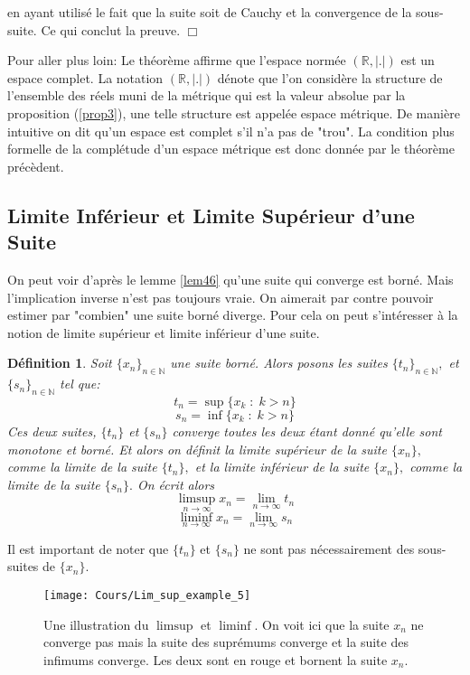 \documentclass[a4paper, 12pt, french, twoside]{article}
\newtheorem{defi}[theorem]{Définition}
\newcommand{\Nn}{{\mathbb{N}}}
\newcommand{\Rr}{{\mathbb{R}}}
\begin{document}
en ayant utilisé le fait que la suite soit de Cauchy et la convergence de la sous-suite. Ce qui conclut la preuve. $\Box$   
\newline 
\newline 
\begin{tcolorbox}
Pour aller plus loin:
Le théorème affirme que l'espace normée $(\Rr, |.|)$ est un espace complet. La notation $(\Rr, |.|)$ dénote que l'on considère la structure de l'ensemble des réels muni de la métrique qui est la valeur absolue par la proposition (\ref{prop3}), une telle structure est appelée espace métrique. De manière intuitive on dit qu'un espace est complet s'il n'a pas de "trou". La condition plus formelle de la complétude d'un espace métrique est donc donnée par le théorème précèdent. 
\end{tcolorbox}

\subsection{Limite Inférieur et Limite Supérieur d'une Suite}
On peut voir d'après le lemme \ref{lem46} qu'une suite qui converge est 
borné. Mais l'implication inverse n'est pas toujours vraie. On aimerait par contre pouvoir estimer par "combien" une suite borné diverge. 
Pour cela on peut s'intéresser à la notion de limite supérieur et limite inférieur d'une suite.

\begin{defi}
    Soit $\{x_n\}_{n\in \Nn}$ une suite borné. Alors posons  les suites $\{t_n\}_{n\in\Nn},$ et $\{s_n\}_{n\in \Nn}$ tel que:
    \[
    t_n = \sup\{x_k \; : \; k > n\}
    \]
    \[
    s_n = \inf\{x_k \; : \; k > n\}
    \]
    Ces deux suites, $\{t_n\}$ et $\{s_n\}$ converge toutes les deux 
    étant donné qu'elle sont monotone et borné. Et alors on définit la 
    limite supérieur de la suite $\{x_n\},$ comme la limite de la suite 
    $\{t_n\}, $ et la limite inférieur de la suite $\{x_n\},$ comme la 
    limite de la suite $\{s_n\}.$ On écrit alors 
    \[
    \limsup_{n \rightarrow \infty} x_n = \lim_{n \rightarrow \infty} t_n
    \]
    \[
    \liminf_{n \rightarrow \infty} x_n = \lim_{n \rightarrow \infty} s_n
    \]
    
\end{defi} 
Il est important de noter que $\{t_n\}$ et $\{s_n\}$ ne sont pas nécessairement des sous-suites de $\{x_n\}.$ 

\begin{figure}[H]
    \centering
    \texttt{[image: Cours/Lim\_sup\_example\_5]}
    \caption{Une illustration du $\limsup$ et $\liminf.$ 
    On voit ici que la suite $x_n$ ne converge pas mais la suite des suprémums converge et la suite des infimums converge. Les deux sont en rouge et bornent la suite $x_n$.}
    \label{fig:enter-label}
\end{figure}
\end{document}
